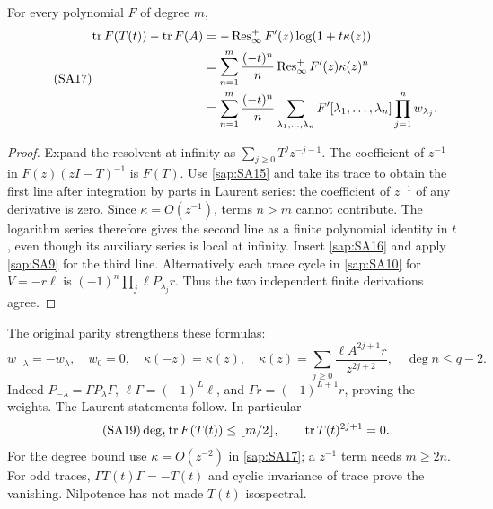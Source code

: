 \begin{saptheorem}
For every polynomial $F$ of degree $m$,
\begin{equation}\tag{SA17}\label{sap:SA17}
\begin{split}
\operatorname{tr} F(T(t))-\operatorname{tr} F(A)
&=-\operatorname{Res}_\infty^+ F'(z)\log(1+t\kappa(z))\\
&=\sum_{n=1}^{m}\frac{(-t)^n}{n}
\operatorname{Res}_\infty^+ F'(z)\kappa(z)^n\\
&=\sum_{n=1}^{m}\frac{(-t)^n}{n}
\sum_{\lambda_1,\ldots,\lambda_n}
F'[\lambda_1,\ldots,\lambda_n]\prod_{j=1}^n w_{\lambda_j}.
\end{split}
\end{equation}
\end{saptheorem}
\begin{proof}
Expand the resolvent at infinity as
$\sum_{j\geq0}T^jz^{-j-1}$. The coefficient of $z^{-1}$
in $F(z)(zI-T)^{-1}$ is $F(T)$.
Use \eqref{sap:SA15} and take its trace to obtain the first
line after integration by parts in Laurent series:
the coefficient of $z^{-1}$ of any derivative is zero.
Since $\kappa=O(z^{-1})$, terms $n>m$ cannot contribute.
The logarithm series therefore gives the second line
as a finite polynomial identity in $t$, even though its
auxiliary series is local at infinity. Insert
\eqref{sap:SA16} and apply \eqref{sap:SA9} for the third line.
Alternatively each trace cycle in \eqref{sap:SA10} for
$V=-r\ell$ is $(-1)^n\prod_j\ell P_{\lambda_j}r$.
Thus the two independent finite derivations agree.
\end{proof}

The original parity strengthens these formulas:
\begin{equation}\tag{SA18}\label{sap:SA18}
w_{-\lambda}=-w_\lambda,\quad w_0=0,\quad
\kappa(-z)=\kappa(z),\quad
\kappa(z)=\sum_{j\geq0}\frac{\ell A^{2j+1}r}{z^{2j+2}},
\quad \deg n\leq q-2.
\end{equation}
Indeed $P_{-\lambda}=\Gamma P_\lambda\Gamma$,
$\ell\Gamma=(-1)^L\ell$, and
$\Gamma r=(-1)^{L+1}r$, proving the weights.
The Laurent statements follow. In particular
\begin{equation}\tag{SA19}\label{sap:SA19}
\deg_t\operatorname{tr} F(T(t))\leq\lfloor m/2\rfloor,\qquad
\operatorname{tr} T(t)^{2j+1}=0.
\end{equation}
For the degree bound use $\kappa=O(z^{-2})$ in
\eqref{sap:SA17}; a $z^{-1}$ term needs $m\geq2n$.
For odd traces, $\Gamma T(t)\Gamma=-T(t)$ and cyclic
invariance of trace prove the vanishing. Nilpotence
has not made $T(t)$ isospectral.

